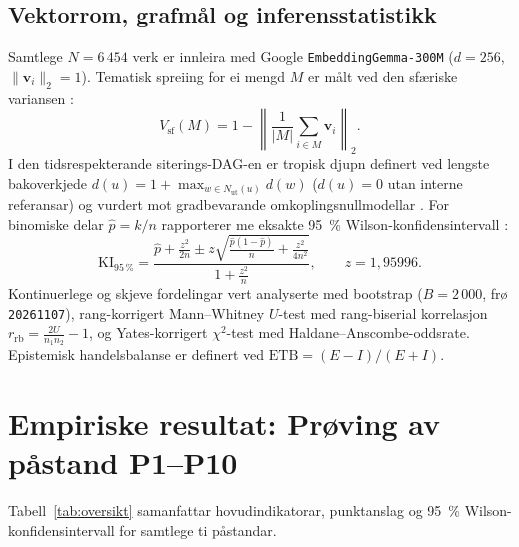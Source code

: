 \documentclass[11pt,a4paper]{article}
\begin{document}
\subsection{Vektorrom, grafmål og inferensstatistikk}
Samtlege $N = 6\,454$ verk er innleira med Google \texttt{EmbeddingGemma-300M} ($d = 256$, $\|\mathbf{v}_i\|_2 = 1$). Tematisk spreiing for ei mengd $M$ er målt ved den sfæriske variansen \cite{mardia2000}:
\begin{equation}
  V_{\mathrm{sf}}(M) = 1 - \left\| \frac{1}{|M|} \sum_{i \in M} \mathbf{v}_i \right\|_2.
\end{equation}
I den tidsrespekterande siterings-DAG-en er tropisk djupn definert ved lengste bakoverkjede $d(u) = 1 + \max_{w \in N_{\mathrm{ut}}(u)} d(w)$ ($d(u)=0$ utan interne referansar) og vurdert mot gradbevarande omkoplingsnullmodellar \cite{maslov2002,newman2010}. For binomiske delar $\hat{p} = k/n$ rapporterer me eksakte 95~\% Wilson-konfidensintervall \cite{wilson1927}:
\begin{equation}
  \mathrm{KI}_{95\,\%} = \frac{\hat{p} + \frac{z^2}{2n} \pm z\sqrt{\frac{\hat{p}(1-\hat{p})}{n} + \frac{z^2}{4n^2}}}{1 + \frac{z^2}{n}}, \qquad z = 1{,}95996.
\end{equation}
Kontinuerlege og skjeve fordelingar vert analyserte med bootstrap ($B = 2\,000$, frø \texttt{20261107}), rang-korrigert Mann--Whitney $U$-test med rang-biserial korrelasjon $r_{\mathrm{rb}} = \frac{2U}{n_1 n_2} - 1$, og Yates-korrigert $\chi^2$-test med Haldane--Anscombe-oddsrate. Epistemisk handelsbalanse er definert ved $\mathrm{ETB} = (E - I)/(E + I)$.

\section{Empiriske resultat: Prøving av påstand P1--P10}

Tabell~\ref{tab:oversikt} samanfattar hovudindikatorar, punktanslag og 95~\% Wilson-konfidensintervall for samtlege ti påstandar.
\end{document}
